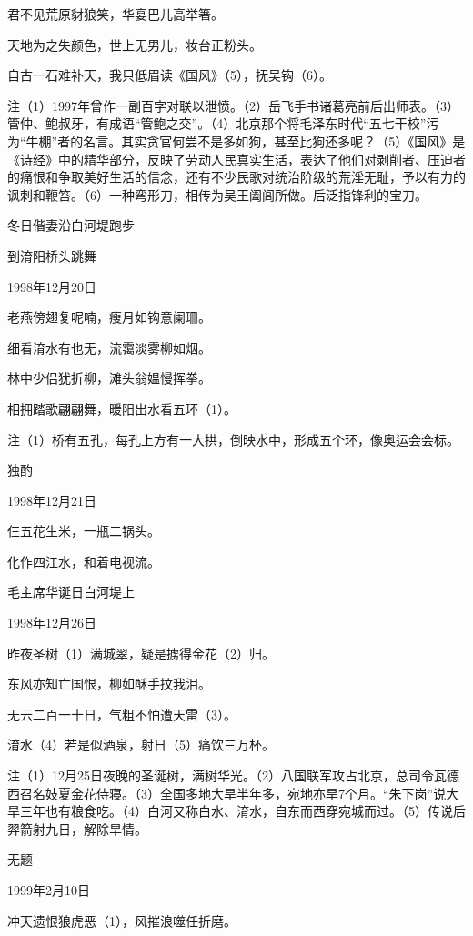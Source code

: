 \documentclass[../../dazhuan.tex]{subfiles}
\begin{document}
君不见荒原豺狼笑，华宴巴儿高举箸。

天地为之失颜色，世上无男儿，妆台正粉头。

自古一石难补天，我只低眉读《国风》（5），抚吴钩（6）。

注（1）1997年曾作一副百字对联以泄愤。（2）岳飞手书诸葛亮前后出师表。（3）管仲、鲍叔牙，有成语“管鲍之交”。（4）北京那个将毛泽东时代“五七干校”污为“牛棚”者的名言。其实贪官何尝不是多如狗，甚至比狗还多呢？（5）《国风》是《诗经》中的精华部分，反映了劳动人民真实生活，表达了他们对剥削者、压迫者的痛恨和争取美好生活的信念，还有不少民歌对统治阶级的荒淫无耻，予以有力的讽刺和鞭笞。（6）一种弯形刀，相传为吴王阖闾所做。后泛指锋利的宝刀。



冬日偕妻沿白河堤跑步

到淯阳桥头跳舞

1998年12月20日

老燕傍翅复呢喃，瘦月如钩意阑珊。

细看淯水有也无，流霭淡雾柳如烟。

林中少侣犹折柳，滩头翁媪慢挥拳。

相拥踏歌翩翩舞，暖阳出水看五环（1）。

注（1）桥有五孔，每孔上方有一大拱，倒映水中，形成五个环，像奥运会会标。



独酌

1998年12月21日

仨五花生米，一瓶二锅头。

化作四江水，和着电视流。



毛主席华诞日白河堤上

1998年12月26日

昨夜圣树（1）满城翠，疑是掳得金花（2）归。

东风亦知亡国恨，柳如酥手抆我泪。

无云二百一十日，气粗不怕遭天雷（3）。

淯水（4）若是似酒泉，射日（5）痛饮三万杯。

注（1）12月25日夜晚的圣诞树，满树华光。（2）八国联军攻占北京，总司令瓦德西召名妓夏金花侍寝。（3）全国多地大旱半年多，宛地亦旱7个月。“朱下岗”说大旱三年也有粮食吃。（4）白河又称白水、淯水，自东而西穿宛城而过。（5）传说后羿箭射九日，解除旱情。



无题

1999年2月10日

冲天遗恨狼虎恶（1），风摧浪噬任折磨。
\end{document}
